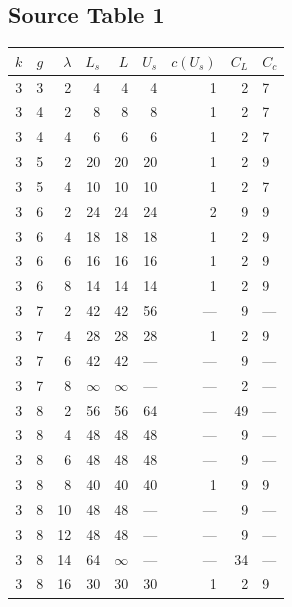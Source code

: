 \subsection*{Source Table 1}
\begin{longtable}{rrrrrrrrl}
\toprule $k$ & $g$ & $\lambda$ & $L_s$ & $L$ & $U_s$ & $c(U_s)$ & $C_L$ & $C_c$ \\ \midrule\endhead
3 & 3 & 2 & 4 & 4 & 4 & 1 & 2 & 7 \\
3 & 4 & 2 & 8 & 8 & 8 & 1 & 2 & 7 \\
3 & 4 & 4 & 6 & 6 & 6 & 1 & 2 & 7 \\
3 & 5 & 2 & 20 & 20 & 20 & 1 & 2 & 9 \\
3 & 5 & 4 & 10 & 10 & 10 & 1 & 2 & 7 \\
3 & 6 & 2 & 24 & 24 & 24 & 2 & 9 & 9 \\
3 & 6 & 4 & 18 & 18 & 18 & 1 & 2 & 9 \\
3 & 6 & 6 & 16 & 16 & 16 & 1 & 2 & 9 \\
3 & 6 & 8 & 14 & 14 & 14 & 1 & 2 & 9 \\
3 & 7 & 2 & 42 & 42 & 56 & --- & 9 & --- \\
3 & 7 & 4 & 28 & 28 & 28 & 1 & 2 & 9 \\
3 & 7 & 6 & 42 & 42 & --- & --- & 9 & --- \\
3 & 7 & 8 & $\infty$ & $\infty$ & --- & --- & 2 & --- \\
3 & 8 & 2 & 56 & 56 & 64 & --- & 49 & --- \\
3 & 8 & 4 & 48 & 48 & 48 & --- & 9 & --- \\
3 & 8 & 6 & 48 & 48 & 48 & --- & 9 & --- \\
3 & 8 & 8 & 40 & 40 & 40 & 1 & 9 & 9 \\
3 & 8 & 10 & 48 & 48 & --- & --- & 9 & --- \\
3 & 8 & 12 & 48 & 48 & --- & --- & 9 & --- \\
3 & 8 & 14 & 64 & $\infty$ & --- & --- & 34 & --- \\
3 & 8 & 16 & 30 & 30 & 30 & 1 & 2 & 9 \\
\bottomrule\end{longtable}

